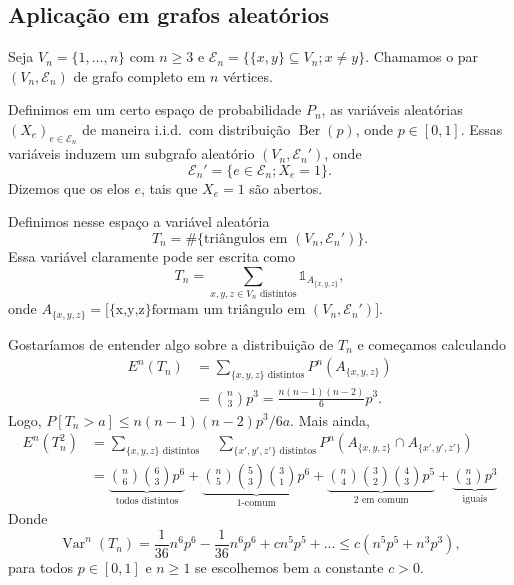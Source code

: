 \documentclass[reqno, draft]{book}
\newcommand*\1{\mathds{1}}
\DeclareMathOperator{\Var}{Var}
\DeclareMathOperator{\Ber}{Ber}
\def \iid{i.i.d.~}
\begin{document}
\subsection{Aplicação em grafos aleatórios}

Seja $V_n = \{1, \dots, n\}$ com $n \geq 3$ e $\mathcal{E}_n = \big\{ \{x,y\} \subseteq V_n; x \neq y \big\}$.
Chamamos o par $(V_n, \mathcal{E}_n)$ de grafo completo em $n$ vértices.

Definimos em um certo espaço de probabilidade $P_n$, as variáveis aleatórias $(X_e)_{e \in \mathcal{E}_n}$ de maneira \iid com distribuição $\Ber(p)$, onde $p \in [0,1]$.
Essas variáveis induzem um subgrafo aleatório $(V_n, \mathcal{E}_n')$, onde
\begin{equation}
  \mathcal{E}_n' = \big\{ e \in \mathcal{E}_n; X_e = 1 \big\}.
\end{equation}
Dizemos que os elos $e$, tais que $X_e = 1$ são abertos.

Definimos nesse espaço a variável aleatória
\begin{equation}
  T_n = \#\big\{\text{triângulos em $(V_n, \mathcal{E}_n')$}\big\}.
\end{equation}
Essa variável claramente pode ser escrita como
\begin{equation}
  T_n = \sum_{x,y,z \in V_n \text{ distintos}} \1_{A_{\{x,y,z\}}},
\end{equation}
onde $A_{\{x,y,z\}} = \big[\text{\{x,y,z\} formam um triângulo em $(V_n, \mathcal{E}_n')$}\big]$.

Gostaríamos de entender algo sobre a distribuição de $T_n$ e começamos calculando
\begin{equation}
  \begin{split}
    E^n(T_n) & = \sum_{\{x,y,z\} \text{ distintos}} P^n(A_{\{x,y,z\}})\\
    & = \binom{n}{3} p^3 = \frac{n(n-1)(n-2)}{6}p^3.
  \end{split}
\end{equation}
Logo, $P[T_n > a] \leq n(n-1)(n-2)p^3/6a$.
Mais ainda,
\begin{equation}
  \begin{split}
    E^n(T_n^2) & = \sum_{\{x,y,z\} \text{ distintos}} \quad \sum_{\{x',y',z'\} \text{ distintos}} P^n(A_{\{x,y,z\}} \cap A_{\{x',y',z'\}})\\
    & = \underbrace{\binom{n}{6} \binom{6}{3} p^6}_{\text{todos distintos}} + \underbrace{\binom{n}{5} \binom{5}{3} \binom{3}{1} p^6}_{\text{$1$-comum}} + \underbrace{\binom{n}{4} \binom{3}{2} \binom{4}{3} p^5}_{\text{$2$ em comum}} + \underbrace{\binom{n}{3}p^3}_{\text{iguais}}
  \end{split}
\end{equation}
Donde
\begin{equation}
  \Var^n(T_n) = \frac{1}{36} n^6 p^6 - \frac{1}{36} n^6 p^6 + c n^5 p^5 + ... \leq c (n^5 p^5 + n^3 p^3),
\end{equation}
para todos $p \in [0,1]$ e $n \geq 1$ se escolhemos bem a constante $c > 0$.
\end{document}
